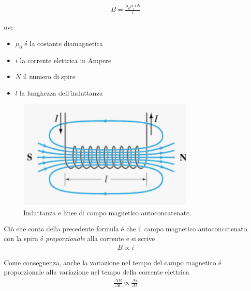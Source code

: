\documentclass[17pt]{extarticle}
\begin{document}
\begin{enumerate}
\begin{eqnarray}\label{eq:Bsolenoide}
	B = \frac{\mu_0\mu_r iN}{l}
\end{eqnarray}






	




ove
\begin{itemize}
	\item	$\mu_0$ \'e la costante diamagnetica
	\item	$i$ la corrente elettrica in Ampere
	\item	$N$ il numero di spire
	\item	$l$ la lunghezza dell'induttanza
\end{itemize}


\begin{figure}[bh!]
	\centering
   	\includegraphics[width=3.5in]{Induttanza.png}%
  	\caption{Induttanza e linee di campo magnetico autoconcatenate.}
   	\label{fig:induttanza}
\end{figure}


Ciò che conta della precedente formula \'e che il campo magnetico autoconcatenato con la spira \'e \emph{proporzionale} alla corrente e si scrive
\begin{eqnarray}
	B \propto i
\end{eqnarray}

Come conseguenza, anche la variazione nel tempo del campo magnetico \'e proporzionale alla variazione nel tempo della corrente elettrica
\begin{eqnarray}
	\frac{\Delta B}{\Delta t} \propto \frac{\Delta i}{\Delta t}
\end{eqnarray}



\end{enumerate}
\end{document}
